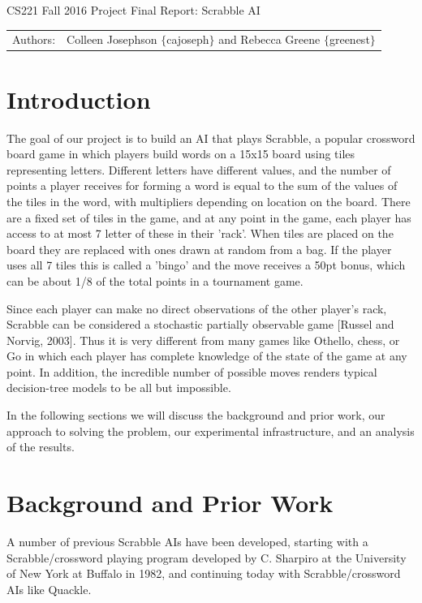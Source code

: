 \documentclass[12pt]{article}
\begin{document}
\begin{center}
{\Large CS221 Fall 2016 Project Final Report: Scrabble AI}

\begin{tabular}{rl}
  Authors: & Colleen Josephson $\{$cajoseph$\}$ and Rebecca Greene $\{$greenest$\}$\\
\end{tabular}
\end{center}


\section*{Introduction}
The goal of our project is to build an AI that plays Scrabble, a
popular crossword board game in which players build words on a 15x15
board using tiles representing letters. Different letters have
different values, and the number of points a player receives for
forming a word is equal to the sum of the values of the tiles in the
word, with multipliers depending on location on the board. There are a
fixed set of tiles in the game, and at any point in the game, each
player has access to at most 7 letter of these in their 'rack'.  When
tiles are placed on the board they are replaced with ones drawn at
random from a bag. If the player uses all 7 tiles this is called a
'bingo' and the move receives a 50pt bonus, which can be about 1/8 of
the total points in a tournament game.

Since each player can make no direct observations of the other
player's rack, Scrabble can be considered a stochastic partially
observable game [Russel and Norvig, 2003]. Thus it is very different
from many games like Othello, chess, or Go in which each player has
complete knowledge of the state of the game at any point. In addition,
the incredible number of possible moves renders typical decision-tree
models to be all but impossible.

In the following sections we will discuss the background and prior
work, our approach to solving the problem, our experimental
infrastructure, and an analysis of the results.\\

\section*{Background and Prior Work}

A number of previous Scrabble AIs have been developed, starting with a
Scrabble/crossword playing program developed by C. Sharpiro at the
University of New York at Buffalo in 1982, and continuing today with
Scrabble/crossword AIs like Quackle.
\end{document}
